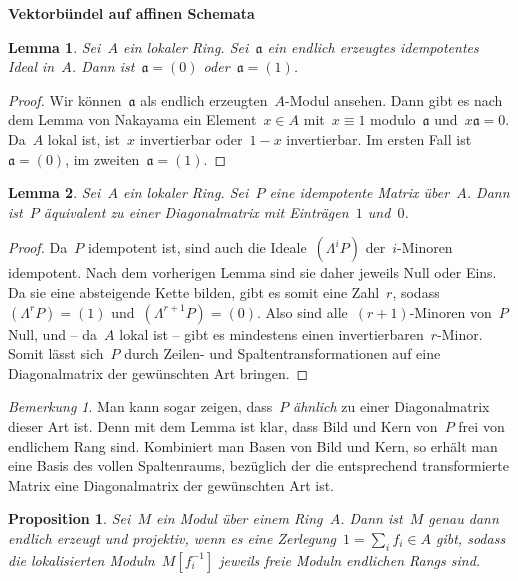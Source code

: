 \documentclass[12pt]{scrartcl}
\theoremstyle{definition}
\theoremstyle{plain}
\newtheorem*{prop}{Proposition}
\newtheorem*{lemma}{Lemma}
\theoremstyle{remark}
\newtheorem*{rem}{Bemerkung}
\newcommand{\aaa}{\mathfrak{a}}
\begin{document}
\enlargethispage{4em}

\begin{center}\huge\textbf{\textsf{Vektorbündel auf affinen Schemata}}\end{center}
\bigskip

\begin{lemma}Sei~$A$ ein lokaler Ring. Sei~$\aaa$ ein endlich erzeugtes
idempotentes Ideal in~$A$. Dann ist~$\aaa = (0)$ oder~$\aaa = (1)$.\end{lemma}

\begin{proof}Wir können~$\aaa$ als endlich erzeugten~$A$-Modul ansehen. Dann
gibt es nach dem Lemma von Nakayama ein Element~$x \in A$ mit~$x \equiv 1$
modulo~$\aaa$ und~$x \aaa = 0$. Da~$A$ lokal ist, ist~$x$ invertierbar
oder~$1-x$ invertierbar. Im ersten Fall ist~$\aaa = (0)$, im zweiten~$\aaa =
(1)$.\end{proof}

\begin{lemma}Sei~$A$ ein lokaler Ring. Sei~$P$ eine idempotente Matrix
über~$A$. Dann ist~$P$ äquivalent zu einer Diagonalmatrix mit Einträgen~$1$
und~$0$.\end{lemma}

\begin{proof}Da~$P$ idempotent ist, sind auch die Ideale~$(\Lambda^i P)$
der~$i$-Minoren idempotent. Nach dem vorherigen Lemma sind sie daher jeweils
Null oder Eins. Da sie eine absteigende Kette bilden, gibt es somit eine
Zahl~$r$, sodass~$(\Lambda^r P) = (1)$ und~$(\Lambda^{r+1} P) = (0)$. Also sind
alle~$(r+1)$-Minoren von~$P$ Null, und -- da~$A$ lokal ist -- gibt es
mindestens einen invertierbaren~$r$-Minor. Somit lässt sich~$P$ durch Zeilen-
und Spaltentransformationen auf eine Diagonalmatrix der gewünschten Art
bringen. \end{proof}

\begin{rem}Man kann sogar zeigen, dass~$P$ \emph{ähnlich} zu einer
Diagonalmatrix dieser Art ist. Denn mit dem Lemma ist klar, dass Bild und Kern
von~$P$ frei von endlichem Rang sind. Kombiniert man Basen von Bild und Kern,
so erhält man eine Basis des vollen Spaltenraums, bezüglich der die
entsprechend transformierte Matrix eine Diagonalmatrix der gewünschten Art
ist.\end{rem}

\begin{prop}Sei~$M$ ein Modul über einem Ring~$A$. Dann ist~$M$ genau dann
endlich erzeugt und projektiv, wenn es eine Zerlegung~$1 = \sum_i f_i \in A$
gibt, sodass die lokalisierten Moduln~$M[f_i^{-1}]$ jeweils freie Moduln
endlichen Rangs sind.\end{prop}
\end{document}
